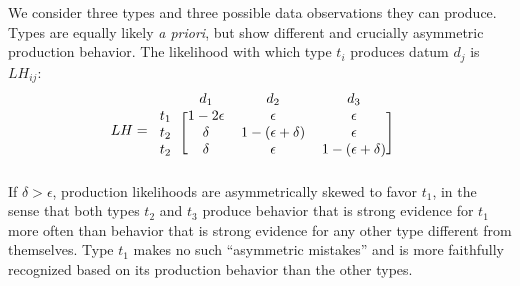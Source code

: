 \documentclass[a4paper, 11pt]{article}
\theoremstyle{Satz}
\begin{document}
We consider three types and three possible data observations they can produce. Types are
equally likely \emph{a priori}, but show different and crucially asymmetric production
behavior. The likelihood with which type $t_i$ produces datum $d_j$ is $LH_{ij}$:
\begin{align*}
  LH & = \begin{blockarray}{lccc}
    & d_1 & d_2 & d_3 \\
    \begin{block}{l[ccc]}
      t_1 & 1-2\epsilon & \epsilon & \epsilon \\
      t_2 & \delta & 1-(\epsilon + \delta) & \epsilon \\
      t_2 & \delta & \epsilon & 1-(\epsilon + \delta)  \\
    \end{block}
  \end{blockarray}
\end{align*}
If $\delta > \epsilon$, production likelihoods are asymmetrically skewed to favor $t_1$, in the
sense that both types $t_2$ and $t_3$ produce behavior that is strong evidence for $t_1$ more
often than behavior that is strong evidence for any other type different from themselves. Type
$t_1$ makes no such ``asymmetric mistakes'' and is more faithfully recognized based on its
production behavior than the other types.
\end{document}

